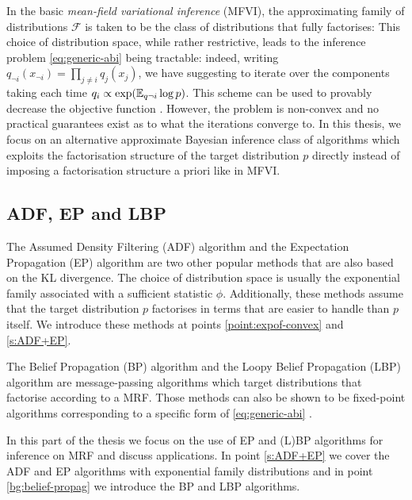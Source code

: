 In the basic \emph{mean-field variational inference} (MFVI), the approximating family of distributions $\mathcal F$ is taken to be the class of distributions that fully factorises:
%
% 
This choice of distribution space, while rather restrictive, leads to the inference problem \eqref{eq:generic-abi} being tractable: indeed, writing $q_{\neg i}(x_{\neg i}) = \prod_{j\neq i} q_{j}(x_{j}) $, we have
suggesting to iterate over the components taking each time $q_{i} \propto \exp(\mathbb E_{q\neg i} \log p) $. This scheme can be used to provably decrease the objective function \citep{hoffman13, kucukelbir16, blei16}. However, the problem is non-convex and no practical guarantees exist as to what the iterations converge to. 
In this thesis, we focus on an alternative approximate Bayesian inference class of algorithms which exploits the factorisation structure of the target distribution $p$ directly instead of imposing a factorisation structure a priori like in MFVI.

\subsection{ADF, EP and LBP}
The Assumed Density Filtering (ADF) algorithm and the  Expectation Propagation (EP) algorithm are two other popular methods that are also based on the KL divergence. The choice of distribution space is usually the exponential family associated with a sufficient statistic $\phi$. Additionally, these methods assume that the target distribution $p$ factorises in terms that are easier to handle than $p$ itself. We introduce these methods at points \ref{point:expof-convex} and \ref{s:ADF+EP}.

The Belief Propagation (BP) algorithm and the Loopy Belief Propagation (LBP) algorithm are message-passing algorithms which target distributions that factorise according to a MRF. Those methods can also be shown to be fixed-point algorithms corresponding to a specific form of \eqref{eq:generic-abi} \citep{yedidia01, yedidia02}.

In this part of the thesis we focus on the use of EP and (L)BP algorithms for inference on MRF and discuss applications. In point \ref{s:ADF+EP} we cover the ADF and EP algorithms with exponential family distributions and in point \ref{bg:belief-propag} we introduce the BP and LBP algorithms.




